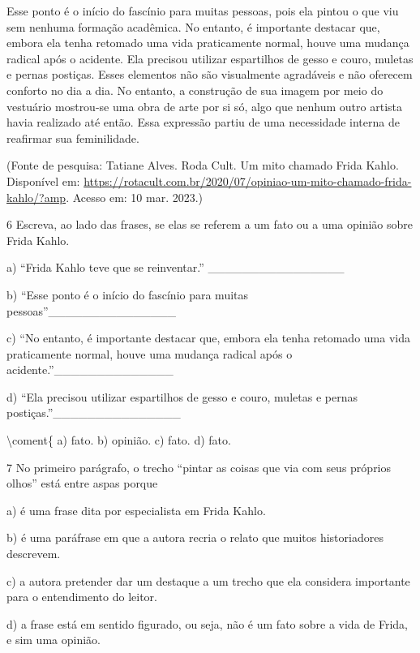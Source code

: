 Esse ponto é o início do fascínio para muitas pessoas, pois ela pintou o
que viu sem nenhuma formação acadêmica. No entanto, é importante
destacar que, embora ela tenha retomado uma vida praticamente normal,
houve uma mudança radical após o acidente. Ela precisou utilizar
espartilhos de gesso e couro, muletas e pernas postiças. Esses elementos
não são visualmente agradáveis e não oferecem conforto no dia a dia. No
entanto, a construção de sua imagem por meio do vestuário mostrou-se uma
obra de arte por si só, algo que nenhum outro artista havia realizado
até então. Essa expressão partiu de uma necessidade interna de reafirmar
sua feminilidade.

(Fonte de pesquisa: Tatiane Alves. Roda Cult. Um mito chamado Frida
Kahlo. Disponível em:
\url{https://rotacult.com.br/2020/07/opiniao-um-mito-chamado-frida-kahlo/?amp}.
Acesso em: 10 mar. 2023.)

\num{6} Escreva, ao lado das frases, se elas se referem a um fato ou a
uma opinião sobre Frida Kahlo.

a) ``Frida Kahlo teve que se reinventar.''
\_\_\_\_\_\_\_\_\_\_\_\_\_\_\_\_

b) ``Esse ponto é o início do fascínio para muitas
pessoas''\_\_\_\_\_\_\_\_\_\_\_\_\_\_\_

c) ``No entanto, é importante destacar que, embora ela tenha retomado
uma vida praticamente normal, houve uma mudança radical após o
acidente.''\_\_\_\_\_\_\_\_\_\_\_\_\_\_

d) ``Ela precisou utilizar espartilhos de gesso e couro, muletas e
pernas postiças.''\_\_\_\_\_\_\_\_\_\_\_\_\_\_\_

\textbackslash coment\{ a) fato. b) opinião. c) fato. d) fato.

\num{7} No primeiro parágrafo, o trecho ``pintar as coisas que via com
seus próprios olhos'' está entre aspas porque

a) é uma frase dita por especialista em Frida Kahlo.

b) é uma paráfrase em que a autora recria o relato que muitos
historiadores descrevem.

c) a autora pretender dar um destaque a um trecho que ela considera
importante para o entendimento do leitor.

d) a frase está em sentido figurado, ou seja, não é um fato sobre a vida
de Frida, e sim uma opinião.


